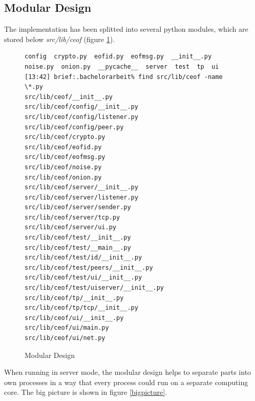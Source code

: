 \subsection{Modular Design}
The implementation has been splitted into several python
modules, which are stored below \textit{src/lib/ceof} 
(figure \ref{pythonmodules}).
\begin{figure}[htbp][htb]
\caption{Modular Design}
\label{pythonmodules}
\begin{verbatim}
config  crypto.py  eofid.py  eofmsg.py  __init__.py  noise.py  onion.py  __pycache__  server  test  tp  ui
[13:42] brief:.bachelorarbeit% find src/lib/ceof -name \*.py
src/lib/ceof/__init__.py
src/lib/ceof/config/__init__.py
src/lib/ceof/config/listener.py
src/lib/ceof/config/peer.py
src/lib/ceof/crypto.py
src/lib/ceof/eofid.py
src/lib/ceof/eofmsg.py
src/lib/ceof/noise.py
src/lib/ceof/onion.py
src/lib/ceof/server/__init__.py
src/lib/ceof/server/listener.py
src/lib/ceof/server/sender.py
src/lib/ceof/server/tcp.py
src/lib/ceof/server/ui.py
src/lib/ceof/test/__init__.py
src/lib/ceof/test/__main__.py
src/lib/ceof/test/id/__init__.py
src/lib/ceof/test/peers/__init__.py
src/lib/ceof/test/ui/__init__.py
src/lib/ceof/test/uiserver/__init__.py
src/lib/ceof/tp/__init__.py
src/lib/ceof/tp/tcp/__init__.py
src/lib/ceof/ui/__init__.py
src/lib/ceof/ui/main.py
src/lib/ceof/ui/net.py
\end{verbatim}
\end{figure}
When running in server mode, the modular design helps
to separate parts into own processes in a way that
every process could run on a separate computing
core. The big picture is shown in figure \ref{bigpicture}.
